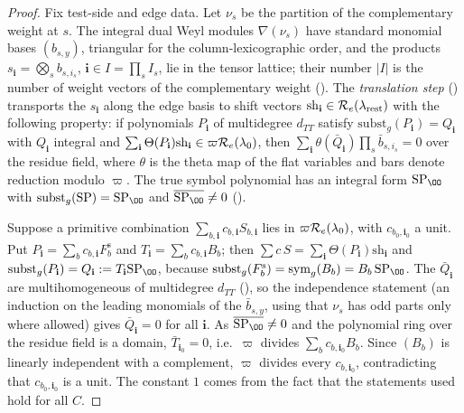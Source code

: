 \begin{proof}
Fix test-side and edge data. Let $\nu_s$ be the partition of the complementary weight at $s$. The integral dual Weyl
modules $\nabla(\nu_s)$ have standard monomial bases $(b_{s,y})$, triangular for the column-lexicographic order, and the
products $s_{\mathbf i}=\bigotimes_sb_{s,i_s}$, $\mathbf i\in I=\prod_sI_s$, lie in the tensor lattice; their number
$|I|$ is the number of weight vectors of the complementary weight
(). The \emph{translation step}
() transports the $s_{\mathbf i}$ along the edge basis to shift
vectors $\mathrm{sh}_{\mathbf i}\in\mathcal R_e(\lambda_{\mathrm{rest}})$ with the following property: if polynomials $P_{\mathbf i}$ of
multidegree $d_{TT}$ satisfy $\mathrm{subst}_g(P_{\mathbf i})=Q_{\mathbf i}$ with $Q_{\mathbf i}$ integral and
$\sum_{\mathbf i}\Theta(P_{\mathbf i})\mathrm{sh}_{\mathbf i}\in\varpi\mathcal R_e(\lambda_0)$, then
$\sum_{\mathbf i}\theta(\bar Q_{\mathbf i})\prod_s\bar b_{s,i_s}=0$ over the residue field, where $\theta$ is the theta map of
the flat variables and bars denote reduction modulo $\varpi$. The true symbol polynomial has an integral form
$\mathrm{SP}_\OO$ with $\mathrm{subst}_g(\mathrm{SP})=\mathrm{SP}_\OO$ and $\overline{\mathrm{SP}_\OO}\ne0$
().

Suppose a primitive combination $\sum_{b,\mathbf i}c_{b,\mathbf i}S_{b,\mathbf i}$ lies in $\varpi\mathcal R_e(\lambda_0)$, with
$c_{b_0,\mathbf i_0}$ a unit. Put $P_{\mathbf i}=\sum_bc_{b,\mathbf i}F^{\mathrm s}_b$ and $T_{\mathbf i}=\sum_bc_{b,\mathbf i}B_b$; then
$\sum c\,S=\sum_{\mathbf i}\Theta(P_{\mathbf i})\mathrm{sh}_{\mathbf i}$ and $\mathrm{subst}_g(P_{\mathbf i})=Q_{\mathbf i}:=T_{\mathbf i}
\mathrm{SP}_\OO$, because $\mathrm{subst}_g(F^{\mathrm s}_b)=\mathrm{sym}_g(B_b)=B_b\,\mathrm{SP}_\OO$. The $\bar Q_{\mathbf i}$ are
multihomogeneous of multidegree $d_{TT}$ (), so the independence
statement  (an induction on the leading monomials of the
$\bar b_{s,y}$, using that $\nu_s$ has odd parts only where allowed) gives $\bar Q_{\mathbf i}=0$ for all $\mathbf i$. As
$\overline{\mathrm{SP}_\OO}\ne0$ and the polynomial ring over the residue field is a domain, $\bar T_{\mathbf i_0}=0$, i.e.\
$\varpi$ divides $\sum_bc_{b,\mathbf i_0}B_b$. Since $(B_b)$ is linearly independent with a complement, $\varpi$ divides every
$c_{b,\mathbf i_0}$, contradicting that $c_{b_0,\mathbf i_0}$ is a unit. The constant $1$ comes from the fact that the
statements used hold for all $C$.
\end{proof}

